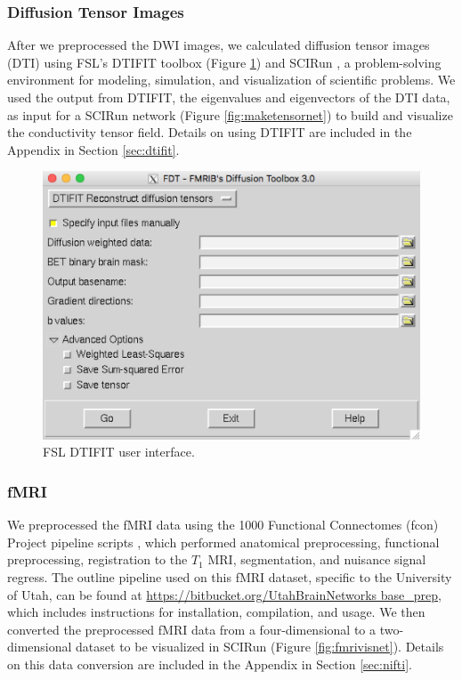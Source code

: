 \subsubsection{Diffusion Tensor Images}

After we preprocessed the DWI images, we calculated diffusion tensor images (DTI) using FSL's DTIFIT toolbox \cite{ref:dtifit} (Figure \ref{fig:dtifit}) and SCIRun \cite{ref:scirun}, a problem-solving environment for modeling, simulation, and visualization of scientific problems. We used the output from DTIFIT, the eigenvalues and eigenvectors of the DTI data, as input for a SCIRun network (Figure \ref{fig:maketensornet}) to build and visualize the conductivity tensor field. Details on using DTIFIT are included in the Appendix in Section \ref{sec:dtifit}.

\begin{figure}[H]
    \centering
    \includegraphics[width=.8\textwidth]{Figures/DTIFIT}
    \caption{FSL DTIFIT user interface.}
    \label{fig:dtifit}
\end{figure}

\subsubsection{fMRI}
\label{sec:fmripre}

We preprocessed the fMRI data using the 1000 Functional Connectomes (fcon) Project pipeline scripts \cite{ref:fcon}, which performed anatomical preprocessing, functional preprocessing, registration to the $T_1$ MRI, segmentation, and nuisance signal regress. The outline pipeline used on this fMRI dataset, specific to the University of Utah, can be found at \url{https://bitbucket.org/UtahBrainNetworks base_prep}, which includes instructions for installation, compilation, and usage. We then converted the preprocessed fMRI data from a four-dimensional to a two-dimensional dataset to be visualized in SCIRun (Figure \ref{fig:fmrivisnet}). Details on this data conversion are included in the Appendix in Section \ref{sec:nifti}. 

